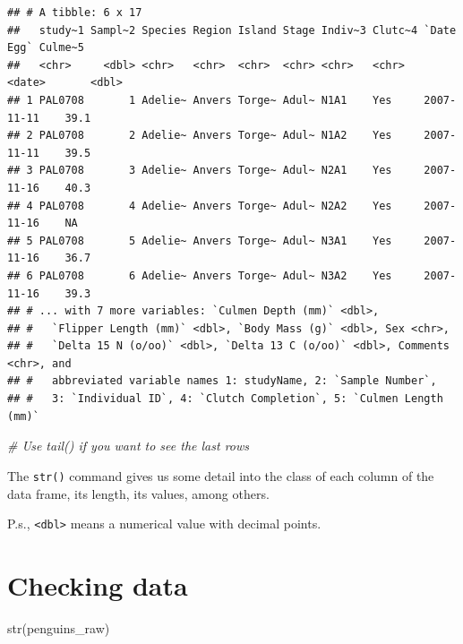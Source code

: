 \documentclass[
]{book}
\newenvironment{Shaded}{\begin{snugshade}}{\end{snugshade}}
\newcommand{\CommentTok}[1]{\textcolor[rgb]{0.56,0.35,0.01}{\textit{#1}}}
\newcommand{\FunctionTok}[1]{\textcolor[rgb]{0.00,0.00,0.00}{#1}}
\newcommand{\NormalTok}[1]{#1}
\begin{document}
\begin{verbatim}
## # A tibble: 6 x 17
##   study~1 Sampl~2 Species Region Island Stage Indiv~3 Clutc~4 `Date Egg` Culme~5
##   <chr>     <dbl> <chr>   <chr>  <chr>  <chr> <chr>   <chr>   <date>       <dbl>
## 1 PAL0708       1 Adelie~ Anvers Torge~ Adul~ N1A1    Yes     2007-11-11    39.1
## 2 PAL0708       2 Adelie~ Anvers Torge~ Adul~ N1A2    Yes     2007-11-11    39.5
## 3 PAL0708       3 Adelie~ Anvers Torge~ Adul~ N2A1    Yes     2007-11-16    40.3
## 4 PAL0708       4 Adelie~ Anvers Torge~ Adul~ N2A2    Yes     2007-11-16    NA  
## 5 PAL0708       5 Adelie~ Anvers Torge~ Adul~ N3A1    Yes     2007-11-16    36.7
## 6 PAL0708       6 Adelie~ Anvers Torge~ Adul~ N3A2    Yes     2007-11-16    39.3
## # ... with 7 more variables: `Culmen Depth (mm)` <dbl>,
## #   `Flipper Length (mm)` <dbl>, `Body Mass (g)` <dbl>, Sex <chr>,
## #   `Delta 15 N (o/oo)` <dbl>, `Delta 13 C (o/oo)` <dbl>, Comments <chr>, and
## #   abbreviated variable names 1: studyName, 2: `Sample Number`,
## #   3: `Individual ID`, 4: `Clutch Completion`, 5: `Culmen Length (mm)`
\end{verbatim}

\begin{Shaded}
\begin{Highlighting}[]
\CommentTok{\# Use tail() if you want to see the last rows}
\end{Highlighting}
\end{Shaded}

The \texttt{str()} command gives us some detail into the class of each column of the data frame, its length, its values, among others.

P.s., \texttt{\textless{}dbl\textgreater{}} means a numerical value with decimal points.

\hypertarget{checking-data}{%
\section{Checking data}\label{checking-data}}

\begin{Shaded}
\begin{Highlighting}[]
\FunctionTok{str}\NormalTok{(penguins\_raw)}
\end{Highlighting}
\end{Shaded}
\end{document}
